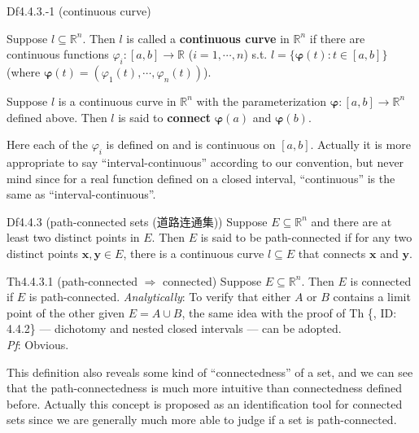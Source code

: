 \documentclass{article}
\begin{document}
\begin{Df}{Df4.4.3.-1 (continuous curve)}
    \begin{compactenum}
        \item Suppose $l\subseteq\mathbb{R}^n$. Then $l$ is called a \textbf{continuous curve} in $\mathbb{R}^n$ if there are continuous functions $\varphi_i: [a,b]\rightarrow\mathbb{R}$ ($i = 1, \cdots, n$) s.t. $l = \{\pmb{\varphi}(t): t\in [a,b]\}$ (where $\pmb{\varphi}(t) = (\varphi_1(t), \cdots, \varphi_n(t))$).
        \item Suppose $l$ is a continuous curve in $\mathbb{R}^n$ with the parameterization $\pmb{\varphi}: [a,b]\rightarrow\mathbb{R}^n$ defined above. Then $l$ is said to \textbf{connect} $\pmb{\varphi}(a)$ and $\pmb{\varphi}(b)$.
    \end{compactenum}
\end{Df}

\begin{Rmk}{}
    Here each of the $\varphi_i$ is defined on and is continuous on $[a,b]$. Actually it is more appropriate to say ``interval-continuous'' according to our convention, but never mind since for a real function defined on a closed interval, ``continuous'' is the same as ``interval-continuous''.
\end{Rmk}

\begin{Df}{Df4.4.3 (path-connected sets (道路连通集))}
    Suppose $E\subseteq\mathbb{R}^n$ and there are at least two distinct points in $E$. Then $E$ is said to be path-connected if for any two distinct points $\pmb{x}, \pmb{y}\in E$, there is a continuous curve $l\subseteq E$ that connects $\pmb{x}$ and $\pmb{y}$.
\end{Df}

\begin{Th}{Th4.4.3.1 (path-connected $\Rightarrow$ connected)}
    Suppose $E\subseteq\mathbb{R}^n$. Then $E$ is connected if $E$ is path-connected.
    \tcblower
    \textcolor{P}{\textit{Analytically}: To verify that either $A$ or $B$ contains a limit point of the other given $E = A\cup B$, the same idea with the proof of Th \{, ID: 4.4.2\} — dichotomy and nested closed intervals — can be adopted.}\\
    \textit{Pf}: Obvious.
\end{Th}

\begin{Rmk}{}
    This definition also reveals some kind of ``connectedness'' of a set, and we can see that the path-connectedness is much more intuitive than connectedness defined before. Actually this concept is proposed as an identification tool for connected sets since we are generally much more able to judge if a set is path-connected.
\end{Rmk}
\end{document}
